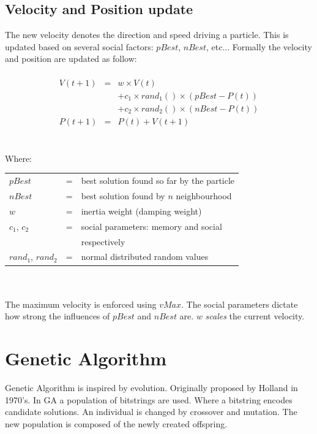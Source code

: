\documentclass{acm_proc_article-sp}
\begin{document}
\subsection{Velocity and Position update}\label{ssec:velocity}
The new velocity denotes the direction and speed driving a particle. This is updated based on several social factors: $pBest$, $nBest$, etc... Formally the velocity and position are updated as follow:\\
\\
  \begin{eqnarray*}
   V(t+1) &=  & w \times V(t) \\
          &   & + c_{1} \times rand_{1}() \times (pBest - P(t)) \\
          &   & + c_{2} \times rand_{2}()\times (nBest - P(t)) \\
   P(t+1) &=  & P(t) + V(t+1)
  \end{eqnarray*}
\\
\\
Where:\\
  \begin{tabular}{lll}
    $pBest$           & =  & best solution found so far by the particle \\
    $nBest$           & =  & best solution found by $n$ neighbourhood \\
    $w$               & =  & inertia weight (damping weight) \\
    $c_1$, $c_2$      & =  & social parameters: memory and social \\
 &  & respectively \\
    $rand_1$, $rand_2$ & = & normal distributed random values \\
  \end{tabular}\\
\\
The maximum velocity is enforced using $vMax$. The social parameters dictate how strong the influences of $pBest$ and $nBest$ are. $w$ \emph{scales} the current velocity.

\section{Genetic Algorithm}\label{sec:ga}
Genetic Algorithm is inspired by evolution. Originally proposed by Holland in 1970's. In GA a population of bitstrings are used. Where a bitstring encodes candidate solutions. An individual is changed by crossover and mutation. The new population is composed of the newly created offspring. 
\end{document}
